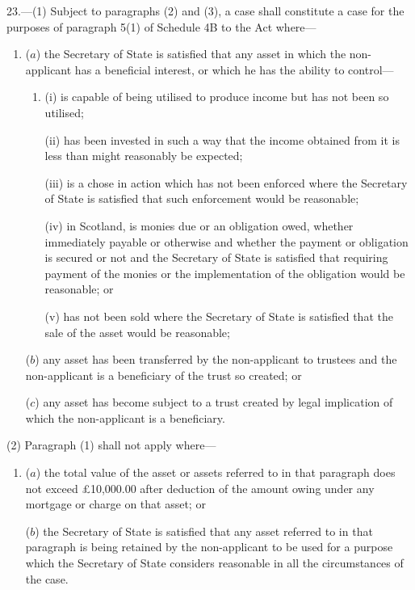 \documentclass[12pt,a4paper]{article}
\begin{document}
23.—(1)
Subject to paragraphs (2) and (3), a case shall constitute a case for the
purposes of paragraph 5(1) of Schedule 4B to the Act where—
\begin{enumerate}\item[]
($a$) the Secretary of State is satisfied that any asset in which the non-applicant
has a beneficial interest, or which he has the ability to control—
\begin{enumerate}\item[]
(i) is capable of being utilised to produce income but has not been so utilised;

(ii) has been invested in such a way that the income obtained from it is less
than might reasonably be expected;

(iii) is a chose in action which has not been enforced where the Secretary of
State is satisfied that such enforcement would be reasonable;

(iv) in Scotland, is monies due or an obligation owed, whether immediately
payable or otherwise and whether the payment or obligation is secured or not and
the Secretary of State is satisfied that requiring payment of the monies or the
implementation of the obligation would be reasonable; or

(v) has not been sold where the Secretary of State is satisfied that the sale of
the asset would be reasonable;
\end{enumerate}

($b$) any asset has been transferred by the non-applicant to trustees and the
non-applicant is a beneficiary of the trust so created; or

($c$) any asset has become subject to a trust created by legal implication of which
the non-applicant is a beneficiary.
\end{enumerate}

(2) Paragraph (1) shall not apply where—
\begin{enumerate}\item[]
($a$) the total value of the asset or assets referred to in that paragraph does not
exceed £10,000.00 after deduction of the amount owing under any mortgage or
charge on that asset; or

($b$) the Secretary of State is satisfied that any asset referred to in that
paragraph is being retained by the non-applicant to be used for a purpose which
the Secretary of State considers reasonable in all the circumstances of the
case.
\end{enumerate}
\end{document}
